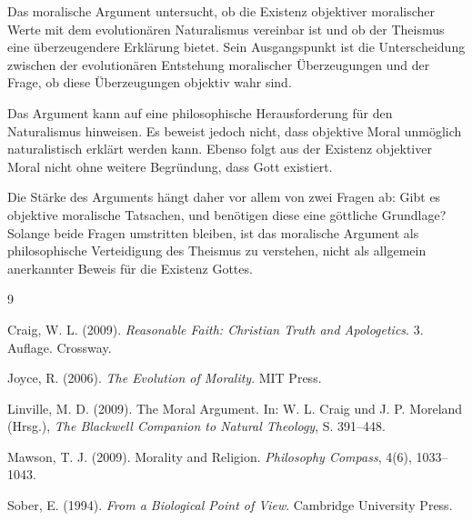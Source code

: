 \documentclass[11pt,a4paper]{article}
\begin{document}
	Das moralische Argument untersucht, ob die Existenz objektiver moralischer Werte mit dem evolutionären Naturalismus vereinbar ist und ob der Theismus eine überzeugendere Erklärung bietet. Sein Ausgangspunkt ist die Unterscheidung zwischen der evolutionären Entstehung moralischer Überzeugungen und der Frage, ob diese Überzeugungen objektiv wahr sind.
	
	Das Argument kann auf eine philosophische Herausforderung für den Naturalismus hinweisen. Es beweist jedoch nicht, dass objektive Moral unmöglich naturalistisch erklärt werden kann. Ebenso folgt aus der Existenz objektiver Moral nicht ohne weitere Begründung, dass Gott existiert.
	
	Die Stärke des Arguments hängt daher vor allem von zwei Fragen ab: Gibt es objektive moralische Tatsachen, und benötigen diese eine göttliche Grundlage? Solange beide Fragen umstritten bleiben, ist das moralische Argument als philosophische Verteidigung des Theismus zu verstehen, nicht als allgemein anerkannter Beweis für die Existenz Gottes.
	
	\begin{thebibliography}{9}
		
		Craig, W. L. (2009).
		\textit{Reasonable Faith: Christian Truth and Apologetics}.
		3. Auflage. Crossway.
		
		Joyce, R. (2006).
		\textit{The Evolution of Morality}.
		MIT Press.
		
		Linville, M. D. (2009).
		The Moral Argument.
		In: W. L. Craig und J. P. Moreland (Hrsg.),
		\textit{The Blackwell Companion to Natural Theology},
		S. 391--448.
		
		Mawson, T. J. (2009).
		Morality and Religion.
		\textit{Philosophy Compass}, 4(6), 1033--1043.
		
		Sober, E. (1994).
		\textit{From a Biological Point of View}.
		Cambridge University Press.
		
	\end{thebibliography}
	
\end{document}
